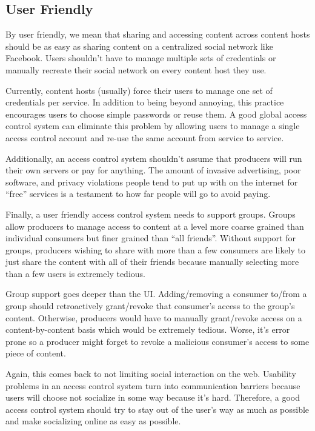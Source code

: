 \documentclass[pdftex,12pt,a4papaer,twoside,notitlepage]{report}
\begin{document}
\subsection{User Friendly}
\label{sec:goal-user}

By user friendly, we mean that sharing and accessing content across content
hosts should be as easy as sharing content on a centralized social network like
Facebook. Users shouldn't have to manage multiple sets of credentials or
manually recreate their social network on every content host they use.

Currently, content hosts (usually) force their users to manage one set of
credentials per service. In addition to being beyond annoying, this practice
encourages users to choose simple passwords or reuse them. A good global access
control system can eliminate this problem by allowing users to manage a single
access control account and re-use the same account from service to service.

Additionally, an access control system shouldn't assume that producers will run
their own servers or pay for anything. The amount of invasive advertising, poor
software, and privacy violations people tend to put up with on the internet for
``free'' services is a testament to how far people will go to avoid paying.

Finally, a user friendly access control system needs to support groups. Groups
allow producers to manage access to content at a level more coarse grained than
individual consumers but finer grained than ``all friends''. Without support for
groups, producers wishing to share with more than a few consumers are likely to
just share the content with all of their friends because manually selecting more
than a few users is extremely tedious.

Group support goes deeper than the UI. Adding/removing a consumer to/from a
group should retroactively grant/revoke that consumer's access to the group's
content. Otherwise, producers would have to manually grant/revoke access on a
content-by-content basis which would be extremely tedious. Worse, it's error
prone so a producer might forget to revoke a malicious consumer's access to some
piece of content.

Again, this comes back to not limiting social interaction on the web. Usability
problems in an access control system turn into communication barriers because
users will choose not socialize in some way because it's hard. Therefore, a good
access control system should try to stay out of the user's way as much as
possible and make socializing online as easy as possible.
\end{document}
